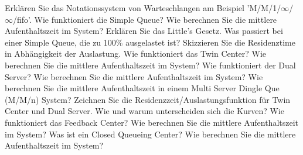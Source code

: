 \documentclass[ngerman,a4paper,12pt]{scrreprt}
\begin{document}
\olR
	\li Erklären Sie das Notationssystem von Warteschlangen am Beispiel 'M/M/1/$\infty$/$\infty$/fifo'.
	\li Wie funktioniert die Simple Queue? Wie berechnen Sie die mittlere Aufenthaltszeit im System?
	\li Erklären Sie das Little's Gesetz.
	\li Was passiert bei einer Simple Queue, die zu 100\% ausgelastet ist? Skizzieren Sie die Residenztime in Abhängigkeit der Auslastung.
	\li Wie funktioniert das Twin Center?  Wie berechnen Sie die mittlere Aufenthaltszeit im System?
	\li Wie funktioniert der Dual Server?  Wie berechnen Sie die mittlere Aufenthaltszeit im System? Wie berechnen Sie die mittlere Aufenthaltszeit in einem Multi Server Dingle Que (M/M/n) System?
	\li Zeichnen Sie die Residenzzeit/Auslastungsfunktion für Twin Center und Dual Server. Wie und warum unterscheiden sich die Kurven?
	\li Wie funktioniert das Feedback Center? Wie berechnen Sie die mittlere Aufenthaltszeit im System?
	\li Was ist ein Closed Queueing Center? Wie berechnen Sie die mittlere Aufenthaltszeit im System?
\olS
\end{document}
